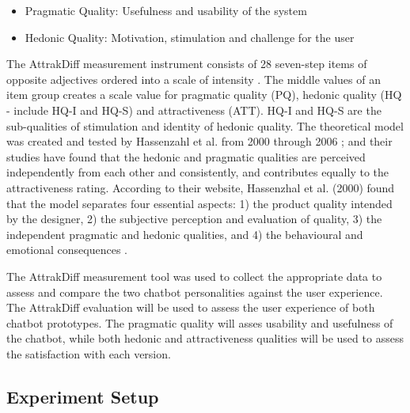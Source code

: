      \begin{itemize}
        \item Pragmatic Quality: Usefulness and usability of the system
        \item Hedonic Quality: Motivation, stimulation and challenge for the user
    \end{itemize}
    
    The AttrakDiff measurement instrument consists of 28 seven-step items of opposite adjectives ordered into a scale of intensity \citep{attrakdiff2013}. The middle values of an item group creates a scale value for pragmatic quality (PQ), hedonic quality (HQ - include HQ-I and HQ-S) and attractiveness (ATT). HQ-I and HQ-S are the sub-qualities of stimulation and identity of hedonic quality. The theoretical model was created and tested by Hassenzahl et al. from 2000 through 2006 \citep{Hassenzahl2000, Hassenzahl2001}; and their studies have found that the hedonic and pragmatic qualities are perceived independently from each other and consistently, and contributes equally to the attractiveness rating. According to their website, Hassenzhal et al. (2000) found that the model separates four essential aspects: 1) the product quality intended by the designer, 2) the subjective perception and evaluation of quality, 3) the independent pragmatic and hedonic qualities, and 4) the behavioural and emotional consequences \citep{attrakdiff2013}.
    
    The AttrakDiff measurement tool was used to collect the appropriate data to assess and compare the two chatbot personalities against the user experience. The AttrakDiff evaluation will be used to assess the user experience of both chatbot prototypes. The pragmatic quality will asses usability and usefulness of the chatbot, while both hedonic and attractiveness qualities will be used to assess the satisfaction with each version.
    
    \subsection{Experiment Setup}
    

